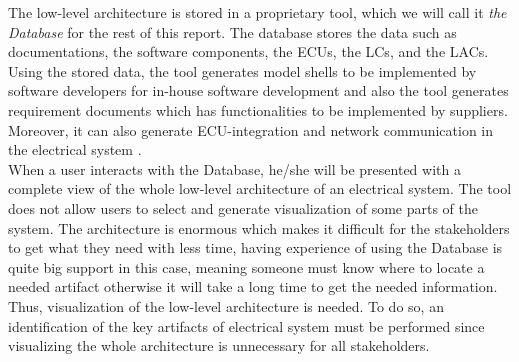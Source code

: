 The low-level architecture is stored in a proprietary tool,  which we will call it \textit{the Database} for the rest of this report. The database stores the data such as documentations, the software components, the ECUs, the LCs, and the LACs. Using the stored data, the tool generates model shells to be implemented by software developers for in-house software development and also the tool generates requirement documents which has functionalities to be implemented by suppliers. Moreover, it can also generate ECU-integration and network communication in the electrical system \cite{Eliasson_2}.\\

When a user interacts with the Database, he/she will be presented with a complete view of the whole low-level architecture of an electrical system. The tool does not allow users to select and generate visualization of some parts of the system. The architecture is enormous which makes it difficult for the stakeholders to get what they need with less time, having experience of using the Database is quite big support in this case, meaning someone must know where to locate a needed artifact otherwise it will take a long time to get the needed information. Thus, visualization of the low-level architecture is needed. To do so, an identification of the key artifacts of electrical system must be performed since visualizing the whole architecture is unnecessary for all stakeholders. \\

